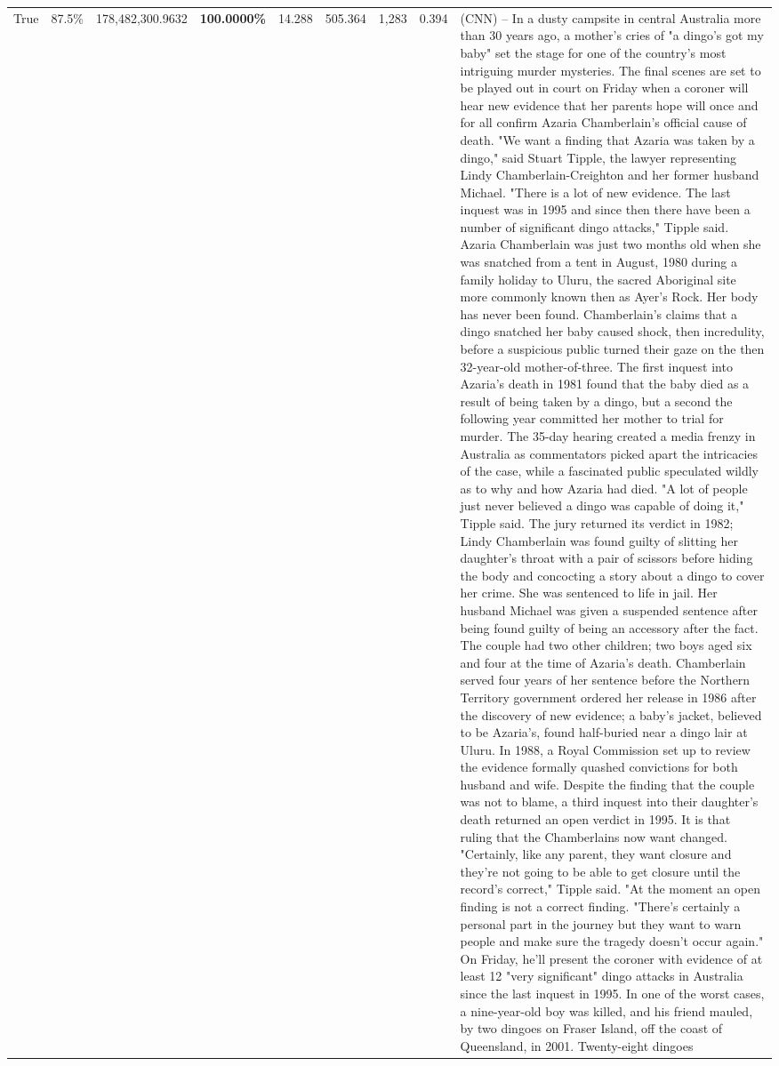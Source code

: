 \begin{table}[H]
\begin{tabular}{lllrlllll}
True & 87.5\% & 178,482,300.9632 & \bfseries \color{red} 100.0000\% & 14.288 & 505.364 & 1,283 & 0.394 & (CNN) -- In a dusty campsite in central Australia more than 30 years ago, a mother's cries of "a dingo's got my baby" set the stage for one of the country's most intriguing murder mysteries. The final scenes are set to be played out in court on Friday when a coroner will hear new evidence that her parents hope will once and for all confirm Azaria Chamberlain's official cause of death. "We want a finding that Azaria was taken by a dingo," said Stuart Tipple, the lawyer representing Lindy Chamberlain-Creighton and her former husband Michael. "There is a lot of new evidence. The last inquest was in 1995 and since then there have been a number of significant dingo attacks," Tipple said. Azaria Chamberlain was just two months old when she was snatched from a tent in August, 1980 during a family holiday to Uluru, the sacred Aboriginal site more commonly known then as Ayer's Rock. Her body has never been found. Chamberlain's claims that a dingo snatched her baby caused shock, then incredulity, before a suspicious public turned their gaze on the then 32-year-old mother-of-three. The first inquest into Azaria's death in 1981 found that the baby died as a result of being taken by a dingo, but a second the following year committed her mother to trial for murder. The 35-day hearing created a media frenzy in Australia as commentators picked apart the intricacies of the case, while a fascinated public speculated wildly as to why and how Azaria had died. "A lot of people just never believed a dingo was capable of doing it," Tipple said. The jury returned its verdict in 1982; Lindy Chamberlain was found guilty of slitting her daughter's throat with a pair of scissors before hiding the body and concocting a story about a dingo to cover her crime. She was sentenced to life in jail. Her husband Michael was given a suspended sentence after being found guilty of being an accessory after the fact. The couple had two other children; two boys aged six and four at the time of Azaria's death. Chamberlain served four years of her sentence before the Northern Territory government ordered her release in 1986 after the discovery of new evidence; a baby's jacket, believed to be Azaria's, found half-buried near a dingo lair at Uluru. In 1988, a Royal Commission set up to review the evidence formally quashed convictions for both husband and wife. Despite the finding that the couple was not to blame, a third inquest into their daughter's death returned an open verdict in 1995. It is that ruling that the Chamberlains now want changed. "Certainly, like any parent, they want closure and they're not going to be able to get closure until the record's correct," Tipple said. "At the moment an open finding is not a correct finding. "There's certainly a personal part in the journey but they want to warn people and make sure the tragedy doesn't occur again." On Friday, he'll present the coroner with evidence of at least 12 "very significant" dingo attacks in Australia since the last inquest in 1995. In one of the worst cases, a nine-year-old boy was killed, and his friend mauled, by two dingoes on Fraser Island, off the coast of Queensland, in 2001. Twenty-eight dingoes 
\end{tabular}
\end{table}
